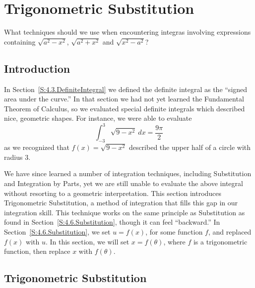 \section{Trigonometric Substitution} \label{S:5.3.TrigSub}

\begin{goals}
\item What techniques should we use when encountering integras involving expressions containing $\sqrt{a^2-x^2}$, $\sqrt{a^2+x^2}$ and $\sqrt{x^2-a^2}$?
\end{goals}

\subsection*{Introduction}

In Section~\ref{S:4.3.DefiniteIntegral} we defined the definite integral as the ``signed area under the curve.'' In that section we had not yet learned the Fundamental Theorem of Calculus, so we evaluated special definite integrals which described nice, geometric shapes. For instance, we were able to evaluate
\begin{equation}
\int_{-3}^3\sqrt{9-x^2}\ dx = \frac{9\pi}{2}\label{eq:trigsub1}
\end{equation}
 as we recognized that $f(x) = \sqrt{9-x^2}$ described the upper half of a circle with radius $3$. 
 
 We have since learned a number of integration techniques, including Substitution and Integration by Parts, yet we are still unable to evaluate the above integral without resorting to a geometric interpretation. This section introduces Trigonometric Substitution, a method of integration that fills this gap in our integration skill. This technique works on the same principle as Substitution as found in Section~\ref{S:4.6.Substitution}, though it can feel ``backward.'' In Section~\ref{S:4.6.Substitution}, we set $u=f(x)$, for some function $f$, and replaced $f(x)$ with $u$. In this section, we will set $x=f(\theta)$, where $f$ is a trigonometric function, then replace $x$ with $f(\theta)$. 



\subsection*{Trigonometric Substitution}

